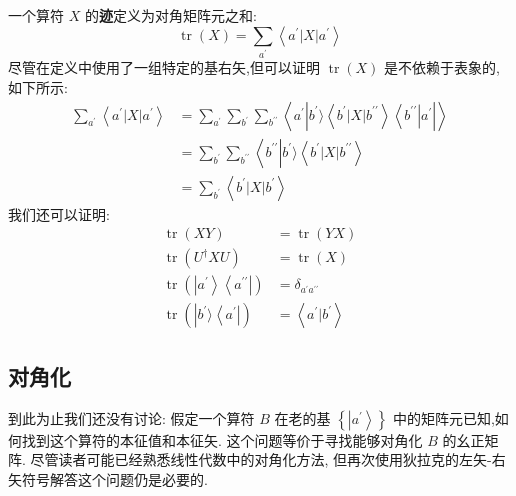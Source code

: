 \documentclass[lang=cn,newtx,10pt,scheme=chinese,thmcnt=section]{elegantbook}
\begin{document}
一个算符 $X$ 的\textbf{迹}定义为对角矩阵元之和:
\begin{equation}
	\operatorname{tr}\left( X\right) = \mathop{\sum }\limits_{{a}^{\prime }}\left\langle {{a}^{\prime }\left| X\right| {a}^{\prime }}\right\rangle
\end{equation}
尽管在定义中使用了一组特定的基右矢,但可以证明 $\operatorname{tr}\left( X\right)$ 是不依赖于表象的,如下所示:
\begin{equation}
	\begin{aligned}
		\mathop{\sum }\limits_{{a}^{\prime }}\left\langle {{a}^{\prime }\left| X\right| {a}^{\prime }}\right\rangle &= \mathop{\sum }\limits_{{a}^{\prime }}\mathop{\sum }\limits_{{b}^{\prime }}\mathop{\sum }\limits_{{b}^{\prime\prime }}\left\langle {{a}^{\prime }\left| {{b}^{\prime }\rangle \left\langle {{b}^{\prime }\left| X\right| {b}^{\prime \prime }}\right\rangle \left\langle {b}^{\prime \prime }\right| {a}^{\prime }}\right| }\right\rangle\\
		&= \mathop{\sum }\limits_{{b}^{\prime }}\mathop{\sum }\limits_{{b}^{\prime \prime }}\left\langle {b}^{\prime \prime }\left| {b}^{\prime }\rangle \left\langle {{b}^{\prime }\left| X\right| {b}^{\prime \prime }}\right\rangle \\
		&= \mathop{\sum }\limits_{{b}^{\prime }}\left\langle {{b}^{\prime }\left| X\right| {b}^{\prime }}\right\rangle
	\end{aligned}
\end{equation}
我们还可以证明:
\begin{equation}
	\begin{aligned}
		\operatorname{tr}\left( {XY}\right) &= \operatorname{tr}\left( {YX}\right)\\
		\operatorname{tr}\left( {{U}^{ \dagger }{XU}}\right) &= \operatorname{tr}\left( X\right)\\
		\operatorname{tr}\left( {\left| {a}^{\prime }\right\rangle \left\langle {a}^{\prime \prime }\right| }\right) &= {\delta }_{{a}^{\prime }{a}^{\prime \prime }}\\
		\operatorname{tr}\left( \left| {{b}^{\prime }\rangle \left\langle {a}^{\prime }\right| } \right) &= \left\langle {{a}^{\prime } | {b}^{\prime }}\right\rangle
	\end{aligned}
\end{equation}
\subsection*{对角化}
到此为止我们还没有讨论: 假定一个算符 $B$ 在老的基 $\left\{ \left| {a}^{\prime }\right\rangle \right\}$ 中的矩阵元已知,如何找到这个算符的本征值和本征矢. 这个问题等价于寻找能够对角化 $B$ 的幺正矩阵. 尽管读者可能已经熟悉线性代数中的对角化方法, 但再次使用狄拉克的左矢-右矢符号解答这个问题仍是必要的.
\end{document}

